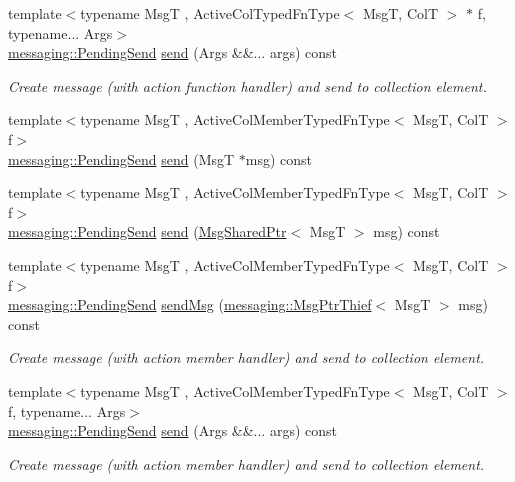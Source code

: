 \begin{DoxyCompactItemize}
{\footnotesize template$<$typename MsgT , Active\+Col\+Typed\+Fn\+Type$<$ Msg\+T, Col\+T $>$ $\ast$ f, typename... Args$>$ }\\\hyperlink{structvt_1_1messaging_1_1_pending_send}{messaging\+::\+Pending\+Send} \hyperlink{structvt_1_1vrt_1_1collection_1_1_sendable_a65e5494a18b398b52f12c056cff1dc16}{send} (Args \&\&... args) const
\begin{DoxyCompactList}\small\item\em Create message (with action function handler) and send to collection element. \end{DoxyCompactList}\item 
{\footnotesize template$<$typename MsgT , Active\+Col\+Member\+Typed\+Fn\+Type$<$ Msg\+T, Col\+T $>$ f$>$ }\\\hyperlink{structvt_1_1messaging_1_1_pending_send}{messaging\+::\+Pending\+Send} \hyperlink{structvt_1_1vrt_1_1collection_1_1_sendable_a321d85ceafaf6525875fb7468a80ac6d}{send} (MsgT $\ast$msg) const
\item 
{\footnotesize template$<$typename MsgT , Active\+Col\+Member\+Typed\+Fn\+Type$<$ Msg\+T, Col\+T $>$ f$>$ }\\\hyperlink{structvt_1_1messaging_1_1_pending_send}{messaging\+::\+Pending\+Send} \hyperlink{structvt_1_1vrt_1_1collection_1_1_sendable_aa8c102820895d01422c14e8c0993fc90}{send} (\hyperlink{namespacevt_ab2b3d506ec8e8d1540aede826d84a239}{Msg\+Shared\+Ptr}$<$ MsgT $>$ msg) const
\item 
{\footnotesize template$<$typename MsgT , Active\+Col\+Member\+Typed\+Fn\+Type$<$ Msg\+T, Col\+T $>$ f$>$ }\\\hyperlink{structvt_1_1messaging_1_1_pending_send}{messaging\+::\+Pending\+Send} \hyperlink{structvt_1_1vrt_1_1collection_1_1_sendable_a1bae1b58a1ce80fd76ee43ff4d33905a}{send\+Msg} (\hyperlink{structvt_1_1messaging_1_1_msg_ptr_thief}{messaging\+::\+Msg\+Ptr\+Thief}$<$ MsgT $>$ msg) const
\begin{DoxyCompactList}\small\item\em Create message (with action member handler) and send to collection element. \end{DoxyCompactList}\item 
{\footnotesize template$<$typename MsgT , Active\+Col\+Member\+Typed\+Fn\+Type$<$ Msg\+T, Col\+T $>$ f, typename... Args$>$ }\\\hyperlink{structvt_1_1messaging_1_1_pending_send}{messaging\+::\+Pending\+Send} \hyperlink{structvt_1_1vrt_1_1collection_1_1_sendable_a65e5494a18b398b52f12c056cff1dc16}{send} (Args \&\&... args) const
\begin{DoxyCompactList}\small\item\em Create message (with action member handler) and send to collection element. \end{DoxyCompactList}\end{DoxyCompactItemize}


